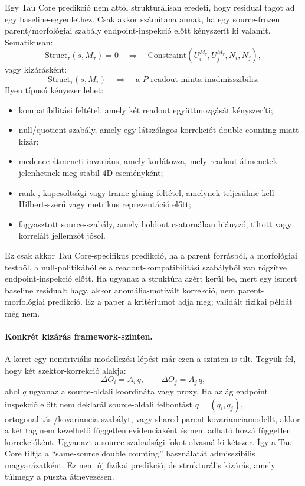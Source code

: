 \documentclass[12pt]{article}
\newcommand{\Mta}{M_{\tau}}
\begin{document}
Egy Tau Core predikció nem attól strukturálisan eredeti, hogy residual tagot
ad egy baseline-egyenlethez.  Csak akkor számítana annak, ha egy
source-frozen parent/morfológiai szabály endpoint-inspekció előtt kényszerít
ki valamit.  Sematikusan:
\[
  \mathrm{Struct}_{\tau}(s,\Mta)=0
  \quad\Longrightarrow\quad
  \mathrm{Constraint}(U_i^{\Mta},U_j^{\Mta},N_i,N_j),
\]
vagy kizárásként:
\[
  \mathrm{Struct}_{\tau}(s,\Mta)
  \quad\Longrightarrow\quad
  \text{a }P\text{ readout-minta inadmisszibilis}.
\]
Ilyen típusú kényszer lehet:
\begin{itemize}
  \item kompatibilitási feltétel, amely két readout együttmozgását kényszeríti;
  \item null/quotient szabály, amely egy látszólagos korrekciót double-counting
  miatt kizár;
  \item medence-átmeneti invariáns, amely korlátozza, mely readout-átmenetek
  jelenhetnek meg stabil 4D eseményként;
  \item rank-, kapcsoltsági vagy frame-gluing feltétel, amelynek teljesülnie
  kell Hilbert-szerű vagy metrikus reprezentáció előtt;
  \item fagyasztott source-szabály, amely holdout csatornában hiányzó, tiltott
  vagy korrelált jellemzőt jósol.
\end{itemize}

Ez csak akkor Tau Core-specifikus predikció, ha a parent forrásból, a
morfológiai testből, a null-politikából és a readout-kompatibilitási szabályból
van rögzítve endpoint-inspekció előtt.  Ha ugyanaz a struktúra azért kerül be,
mert egy ismert baseline residualt hagy, akkor anomália-motivált korrekció,
nem parent-morfológiai predikció.  Ez a paper a kritériumot adja meg; validált
fizikai példát még nem.

\paragraph{Konkrét kizárás framework-szinten.}
A keret egy nemtriviális modellezési lépést már ezen a szinten is tilt.
Tegyük fel, hogy két szektor-korrekció alakja:
\[
  \Delta O_i=A_i\,q,\qquad \Delta O_j=A_j\,q,
\]
ahol \(q\) ugyanaz a source-oldali koordináta vagy proxy.  Ha az ág endpoint
inspekció előtt nem deklarál source-oldali felbontást \(q=(q_i,q_j)\),
ortogonalitási/kovariancia szabályt, vagy shared-parent kovarianciamodellt,
akkor a két tag nem kezelhető független evidenciaként és nem adható hozzá
független korrekcióként.  Ugyanazt a source szabadsági fokot olvasná ki
kétszer.  Így a Tau Core tiltja a ``same-source double counting'' használatát
admisszibilis magyarázatként.  Ez nem új fizikai predikció, de strukturális
kizárás, amely túlmegy a puszta átnevezésen.
\end{document}
